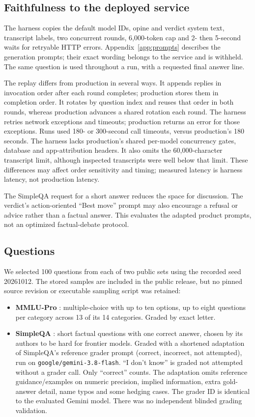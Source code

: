 \documentclass[11pt]{article}
\begin{document}
\subsection{Faithfulness to the deployed service}
The harness copies the default model IDs, opine and verdict system text, transcript labels, two concurrent rounds, 6,000-token cap and 2- then 5-second waits for retryable HTTP errors. Appendix~\ref{app:prompts} describes the generation prompts; their exact wording belongs to the service and is withheld. The same question is used throughout a run, with a requested final answer line.

The replay differs from production in several ways. It appends replies in invocation order after each round completes; production stores them in completion order. It rotates by question index and reuses that order in both rounds, whereas production advances a shared rotation each round. The harness retries network exceptions and timeouts; production returns an error for those exceptions. Runs used 180- or 300-second call timeouts, versus production's 180 seconds. The harness lacks production's shared per-model concurrency gates, database and app-attribution headers. It also omits the 60,000-character transcript limit, although inspected transcripts were well below that limit. These differences may affect order sensitivity and timing; measured latency is harness latency, not production latency.

The SimpleQA request for a short answer reduces the space for discussion. The verdict's action-oriented ``Best move'' prompt may also encourage a refusal or advice rather than a factual answer. This evaluates the adapted product prompts, not an optimized factual-debate protocol.

\subsection{Questions}
We selected 100 questions from each of two public sets using the recorded seed 20261012. The stored samples are included in the public release, but no pinned source revision or executable sampling script was retained:
\begin{itemize}
  \item \textbf{MMLU-Pro} \citep{wang2024mmlupro}: multiple-choice with up to ten options, up to eight questions per category across 13 of its 14 categories. Graded by exact letter.
  \item \textbf{SimpleQA} \citep{wei2024simpleqa}: short factual questions with one correct answer, chosen by its authors to be hard for frontier models. Graded with a shortened adaptation of SimpleQA's reference grader prompt (correct, incorrect, not attempted), run on \texttt{google/gemini-3.8-flash}. ``I don't know'' is graded not attempted without a grader call. Only ``correct'' counts. The adaptation omits reference guidance/examples on numeric precision, implied information, extra gold-answer detail, name typos and some hedging cases. The grader ID is identical to the evaluated Gemini model. There was no independent blinded grading validation.
\end{itemize}
\end{document}
